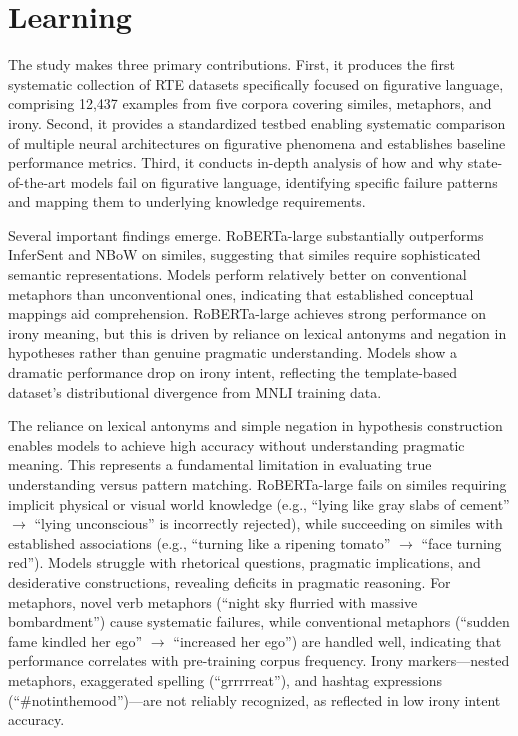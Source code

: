 \documentclass[12pt]{article}
\begin{document}
\section{Learning}

The study makes three primary contributions. First, it produces the first systematic collection of RTE datasets specifically focused on figurative language, comprising 12,437 examples from five corpora covering similes, metaphors, and irony. Second, it provides a standardized testbed enabling systematic comparison of multiple neural architectures on figurative phenomena and establishes baseline performance metrics. Third, it conducts in-depth analysis of how and why state-of-the-art models fail on figurative language, identifying specific failure patterns and mapping them to underlying knowledge requirements.

Several important findings emerge. RoBERTa-large substantially outperforms InferSent and NBoW on similes, suggesting that similes require sophisticated semantic representations. Models perform relatively better on conventional metaphors than unconventional ones, indicating that established conceptual mappings aid comprehension. RoBERTa-large achieves strong performance on irony meaning, but this is driven by reliance on lexical antonyms and negation in hypotheses rather than genuine pragmatic understanding. Models show a dramatic performance drop on irony intent, reflecting the template-based dataset's distributional divergence from MNLI training data.

The reliance on lexical antonyms and simple negation in hypothesis construction enables models to achieve high accuracy without understanding pragmatic meaning. This represents a fundamental limitation in evaluating true understanding versus pattern matching. RoBERTa-large fails on similes requiring implicit physical or visual world knowledge (e.g., ``lying like gray slabs of cement'' $\rightarrow$ ``lying unconscious'' is incorrectly rejected), while succeeding on similes with established associations (e.g., ``turning like a ripening tomato'' $\rightarrow$ ``face turning red''). Models struggle with rhetorical questions, pragmatic implications, and desiderative constructions, revealing deficits in pragmatic reasoning. For metaphors, novel verb metaphors (``night sky flurried with massive bombardment'') cause systematic failures, while conventional metaphors (``sudden fame kindled her ego'' $\rightarrow$ ``increased her ego'') are handled well, indicating that performance correlates with pre-training corpus frequency. Irony markers---nested metaphors, exaggerated spelling (``grrrrreat''), and hashtag expressions (``\#notinthemood'')---are not reliably recognized, as reflected in low irony intent accuracy.
\end{document}
